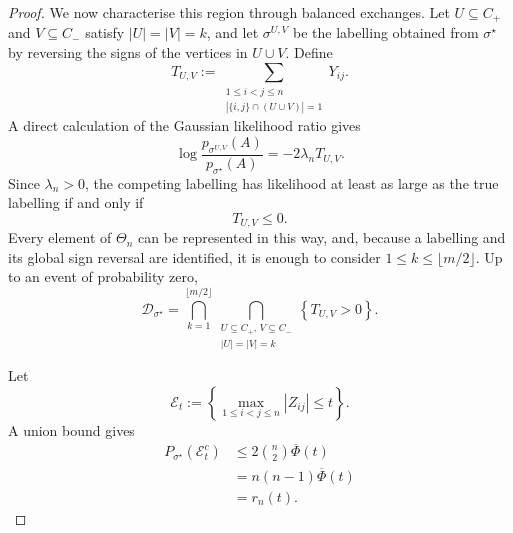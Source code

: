 \documentclass[10pt,a4paper]{amsart}
\begin{document}
\begin{proof}
We now characterise this region through balanced exchanges. Let
\(U\subseteq C_+\) and \(V\subseteq C_-\) satisfy \(|U|=|V|=k\),
and let $\sigma^{U,V}$ be the labelling obtained from
$\sigma^\star$ by reversing the signs of the vertices in $U\cup V$.
Define
\begin{equation}
T_{U,V}
:=
\sum_{\substack{1\leq i<j\leq n\\
|\{i,j\}\cap(U\cup V)|=1}}
Y_{ij}.
\label{eq:gwsbmExchangeStatistic}
\end{equation}
A direct calculation of the Gaussian likelihood ratio gives
\begin{equation}
\log
\frac{
p_{\sigma^{U,V}}(A)
}{
p_{\sigma^\star}(A)
}
=
-2\lambda_n T_{U,V}.
\label{eq:gwsbmExchangeLikelihoodRatio}
\end{equation}
Since $\lambda_n>0$, the competing labelling has likelihood at least
as large as the true labelling if and only if
\begin{equation}
T_{U,V}\leq0.
\label{eq:gwsbmDetrimentalExchange}
\end{equation}
Every element of $\Theta_n$ can be represented in this way, and,
because a labelling and its global sign reversal are identified, it is
enough to consider \(1\leq k\leq\lfloor m/2\rfloor\).
Up to an event of probability zero,
\begin{equation}
\mathcal D_{\sigma^\star}
=
\bigcap_{k=1}^{\lfloor m/2\rfloor}
\bigcap_{\substack{U\subseteq C_+,\,V\subseteq C_-\\
|U|=|V|=k}}
\left\{
T_{U,V}>0
\right\}.
\label{eq:gwsbmMLRegionIntersections}
\end{equation}

Let
\begin{equation}
\mathcal E_t
:=
\left\{
\max_{1\leq i<j\leq n}|Z_{ij}|\leq t
\right\}.
\label{eq:gwsbmBoundedNoiseEvent}
\end{equation}
A union bound gives
\begin{align}
P_{\sigma^\star}
\left(
\mathcal E_t^c
\right)
&\leq
2\binom{n}{2}\overline\Phi(t)\\
&=
n(n-1)\overline\Phi(t)\\
&=
r_n(t).
\label{eq:gwsbmBoundedNoiseProbability}
\end{align}


\end{proof}
\end{document}
